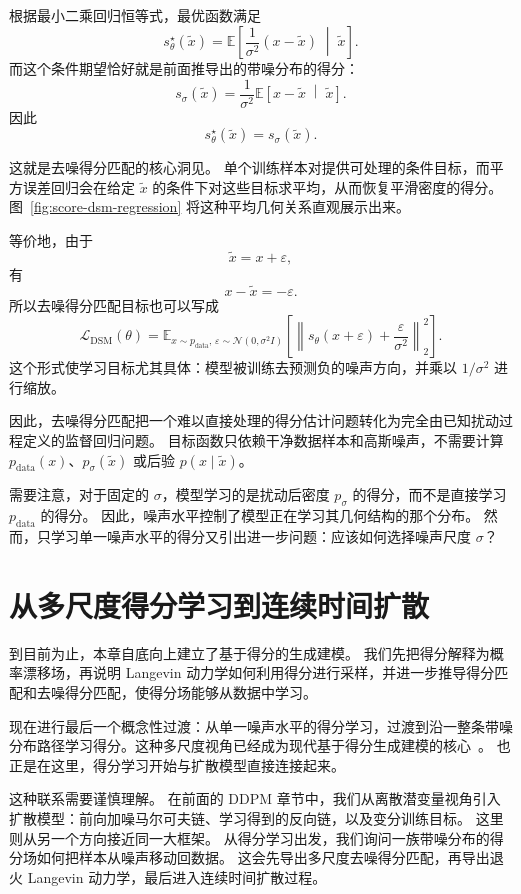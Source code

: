根据最小二乘回归恒等式，最优函数满足
\[
s_\theta^\star(\tilde{x})
=
\mathbb{E}
\left[
\frac{1}{\sigma^2}(x-\tilde{x})
\;\middle|\;
\tilde{x}
\right].
\]
而这个条件期望恰好就是前面推导出的带噪分布的得分：
\[
s_\sigma(\tilde{x})
=
\frac{1}{\sigma^2}
\mathbb{E}
\left[
x-\tilde{x}
\;\middle|\;
\tilde{x}
\right].
\]
因此
\[
\boxed{
s_\theta^\star(\tilde{x})=s_\sigma(\tilde{x}).
}
\]

这就是去噪得分匹配的核心洞见。
单个训练样本对提供可处理的条件目标，而平方误差回归会在给定 $\tilde{x}$ 的条件下对这些目标求平均，从而恢复平滑密度的得分。
图~\ref{fig:score-dsm-regression} 将这种平均几何关系直观展示出来。



等价地，由于
\[
\tilde{x}=x+\varepsilon,
\]
有
\[
x-\tilde{x}=-\varepsilon.
\]
所以去噪得分匹配目标也可以写成
\[
\mathcal{L}_{\text{DSM}}(\theta)
=
\mathbb{E}_{x\sim p_{\text{data}},\,
\varepsilon\sim\mathcal{N}(0,\sigma^2 I)}
\left[
\left\|
s_\theta(x+\varepsilon)
+
\frac{\varepsilon}{\sigma^2}
\right\|_2^2
\right].
\]
这个形式使学习目标尤其具体：模型被训练去预测负的噪声方向，并乘以 $1/\sigma^2$ 进行缩放。

因此，去噪得分匹配把一个难以直接处理的得分估计问题转化为完全由已知扰动过程定义的监督回归问题。
目标函数只依赖干净数据样本和高斯噪声，不需要计算 $p_{\text{data}}(x)$、$p_\sigma(\tilde{x})$ 或后验 $p(x\mid\tilde{x})$。

需要注意，对于固定的 $\sigma$，模型学习的是扰动后密度 $p_\sigma$ 的得分，而不是直接学习 $p_{\text{data}}$ 的得分。
因此，噪声水平控制了模型正在学习其几何结构的那个分布。
然而，只学习单一噪声水平的得分又引出进一步问题：应该如何选择噪声尺度 $\sigma$？

\section{从多尺度得分学习到连续时间扩散}

到目前为止，本章自底向上建立了基于得分的生成建模。
我们先把得分解释为概率漂移场，再说明 Langevin 动力学如何利用得分进行采样，并进一步推导得分匹配和去噪得分匹配，使得分场能够从数据中学习。

现在进行最后一个概念性过渡：从单一噪声水平的得分学习，过渡到沿一整条带噪分布路径学习得分。这种多尺度视角已经成为现代基于得分生成建模的核心~\cite{song2019generative,song2021scorebased}。
也正是在这里，得分学习开始与扩散模型直接连接起来。

这种联系需要谨慎理解。
在前面的 DDPM 章节中，我们从离散潜变量视角引入扩散模型：前向加噪马尔可夫链、学习得到的反向链，以及变分训练目标。
这里则从另一个方向接近同一大框架。
从得分学习出发，我们询问一族带噪分布的得分场如何把样本从噪声移动回数据。
这会先导出多尺度去噪得分匹配，再导出退火 Langevin 动力学，最后进入连续时间扩散过程。


